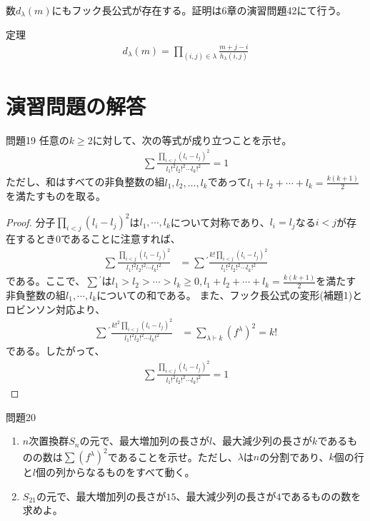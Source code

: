 \documentclass[a4paper,11pt]{jsarticle}
\theoremstyle{plain}
\theoremstyle{definition}
\renewcommand{\(}{\left(}
\renewcommand{\)}{\right)}
\renewcommand{\[}{\left[}
\renewcommand{\]}{\right]}
\renewcommand{\{}{\left\lbrace}
\renewcommand{\}}{\right\rbrace}
\begin{document}
数$d_\lambda(m)$にもフック長公式が存在する。証明は6章の演習問題42にて行う。
\begin{itembox}[l]{定理}
    \begin{align*}
        d_\lambda(m) = \prod_{(i,j) \in \lambda} \frac{m + j - i}{h_{\lambda}(i,j)}
    \end{align*}
\end{itembox}

\newpage
\section{演習問題の解答}



\begin{itembox}[l]{問題19}
    任意の$k \geq 2$に対して、次の等式が成り立つことを示せ。
    \begin{align*}
        \sum \frac{\prod_{i<j}(l_i-l_j)^2}{l_1!^2 l_2!^2 \cdots l_k!^2} = 1
    \end{align*}
    ただし、和はすべての非負整数の組$l_1, l_2, \ldots, l_k$であって$l_1 + l_2 + \cdots + l_k = \frac{k(k+1)}{2}$を満たすものを取る。
\end{itembox}

\begin{proof}
    分子$\prod_{i<j}(l_i-l_j)^2$は$l_1, \cdots, l_k$について対称であり、$l_i = l_j$なる$i<j$が存在するとき$0$であることに注意すれば、
    \begin{align*}
        \sum \frac{\prod_{i<j}(l_i-l_j)^2}{l_1!^2 l_2!^2 \cdots l_k!^2} &= \sum{}^{'} \frac{k! \prod_{i<j}(l_i-l_j)^2}{l_1!^2 l_2!^2 \cdots l_k!^2}
    \end{align*}
    である。ここで、$\sum{}^{'}$は$l_1 > l_2 > \cdots > l_k \geq 0, l_1 + l_2 + \cdots + l_k = \frac{k(k+1)}{2}$を満たす非負整数の組$l_1, \cdots, l_k$についての和である。
    また、フック長公式の変形(補題1)とロビンソン対応より、
    \begin{align*}
        \sum{}^{'} \frac{k!^2 \prod_{i<j}(l_i-l_j)^2}{l_1!^2 l_2!^2 \cdots l_k!^2} &= \sum_{\lambda \vdash k} (f^{\lambda})^2 = k!
    \end{align*}
    である。したがって、
    \begin{align*}
        \sum \frac{\prod_{i<j}(l_i-l_j)^2}{l_1!^2 l_2!^2 \cdots l_k!^2} = 1
    \end{align*}
\end{proof}

\begin{itembox}[l]{問題20}
    \begin{enumerate}
        \item $n$次置換群$S_n$の元で、最大増加列の長さが$l$、最大減少列の長さが$k$であるものの数は$\sum (f^{\lambda})^2$であることを示せ。ただし、$\lambda$は$n$の分割であり、$k$個の行と$l$個の列からなるものをすべて動く。
        \item $S_{21}$の元で、最大増加列の長さが$15$、最大減少列の長さが$4$であるものの数を求めよ。
    \end{enumerate}
\end{itembox}
\end{document}
